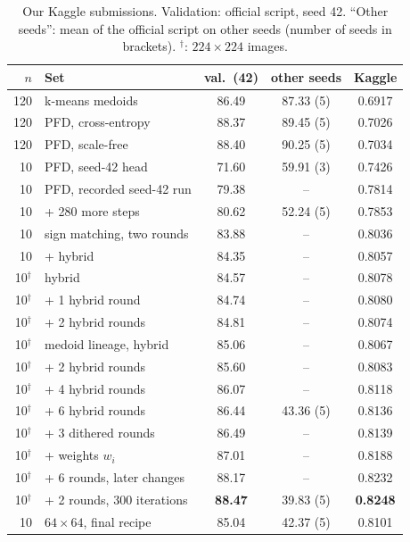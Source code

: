 \documentclass[journal]{IEEEtran}
\begin{document}
\begin{table}[t]
\centering
\caption{Our Kaggle submissions. Validation: official script, seed 42. ``Other seeds'': mean of the official script
on other seeds (number of seeds in brackets). $^\dagger$: $224\times224$ images.}
\label{tab:submissions}
\setlength{\tabcolsep}{3pt}
\begin{tabular}{rlccc}
\toprule
$n$ & Set & val.\ (42) & other seeds & Kaggle \\
\midrule
120 & k-means medoids & 86.49 & 87.33 (5) & 0.6917 \\
120 & PFD, cross-entropy & 88.37 & 89.45 (5) & 0.7026 \\
120 & PFD, scale-free & 88.40 & 90.25 (5) & 0.7034 \\
10 & PFD, seed-42 head & 71.60 & 59.91 (3) & 0.7426 \\
10 & PFD, recorded seed-42 run & 79.38 & -- & 0.7814 \\
10 & \quad + 280 more steps & 80.62 & 52.24 (5) & 0.7853 \\
10 & sign matching, two rounds & 83.88 & -- & 0.8036 \\
10 & \quad + hybrid & 84.35 & -- & 0.8057 \\
10$^\dagger$ & hybrid & 84.57 & -- & 0.8078 \\
10$^\dagger$ & \quad + 1 hybrid round & 84.74 & -- & 0.8080 \\
10$^\dagger$ & \quad + 2 hybrid rounds & 84.81 & -- & 0.8074 \\
10$^\dagger$ & medoid lineage, hybrid & 85.06 & -- & 0.8067 \\
10$^\dagger$ & \quad + 2 hybrid rounds & 85.60 & -- & 0.8083 \\
10$^\dagger$ & \quad + 4 hybrid rounds & 86.07 & -- & 0.8118 \\
10$^\dagger$ & \quad + 6 hybrid rounds & 86.44 & 43.36 (5) & 0.8136 \\
10$^\dagger$ & \quad + 3 dithered rounds & 86.49 & -- & 0.8139 \\
10$^\dagger$ & \quad + weights $w_i$ & 87.01 & -- & 0.8188 \\
10$^\dagger$ & \quad + 6 rounds, later changes & 88.17 & -- & 0.8232 \\
10$^\dagger$ & \quad + 2 rounds, 300 iterations & \textbf{88.47} & 39.83 (5) & \textbf{0.8248} \\
10 & $64\times64$, final recipe & 85.04 & 42.37 (5) & 0.8101 \\
\bottomrule
\end{tabular}
\end{table}
\end{document}
